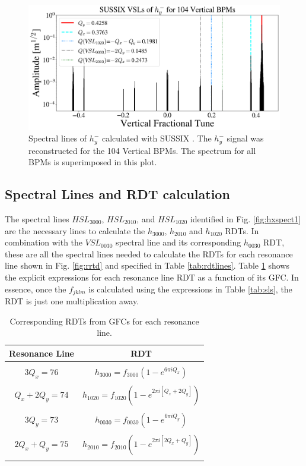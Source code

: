 \begin{figure}[H]
    \centering
    \includegraphics[width=\columnwidth]{chapter4/hyspect.png}
    \caption{Spectral lines of $h_y^{-}$ calculated with SUSSIX \cite{sussix}. The $h_y^{-}$ signal was reconstructed for the 104 Vertical BPMs. The spectrum for all BPMs is superimposed in this plot.}
    \label{fig:hyspect1}
\end{figure}

\subsection{Spectral Lines and RDT calculation}

The spectral lines $HSL_{3000}$, $HSL_{2010}$, and $HSL_{1020}$ identified in Fig. \ref{fig:hxspect1} are the necessary lines to calculate the $h_{3000}$, $h_{2010}$ and $h_{1020}$ RDTs. In combination with the $VSL_{0030}$ spectral line and its corresponding $h_{0030}$ RDT, these are all the spectral lines needed to calculate the RDTs for each resonance line shown in Fig. \ref{fig:rrtd} and specified in Table \ref{tab:rdtlines}. Table \ref{tab:rdts2} shows the explicit expressions for each resonance line RDT as a function of its GFC. In essence, once the $f_{jklm}$ is calculated using the expressions in Table \ref{tab:sls}, the RDT is just one multiplication away.

\begin{table}[H]
    \centering
    \caption{Corresponding RDTs from GFCs for each resonance line.}
    \label{tab:rdts2}
    \begin{tabular}{cc}
    \toprule
    \textbf{Resonance Line} & \textbf{RDT} \\ \hline
     &  \\
    $3Q_x=76$ & $h_{3000}= f_{3000}\left( 1-e^{6\pi i  Q_x  } \right)$ \\
     &  \\
    $Q_x+2Q_y=74$ & $h_{1020}=f_{1020} \left( 1-e^{2\pi i \left[Q_x + 2 Q_y \right] }\right) $ \\
     &  \\
    $3Q_y=73$ & $h_{0030}= f_{0030}\left( 1-e^{6\pi i  Q_y  } \right)$ \\
     &  \\
    $2Q_x+Q_y=75$ & $h_{2010}=f_{2010} \left( 1-e^{2\pi i \left[2Q_x + Q_y \right] }\right) $ \\
     &  \\ \hline
    \end{tabular}
\end{table}

